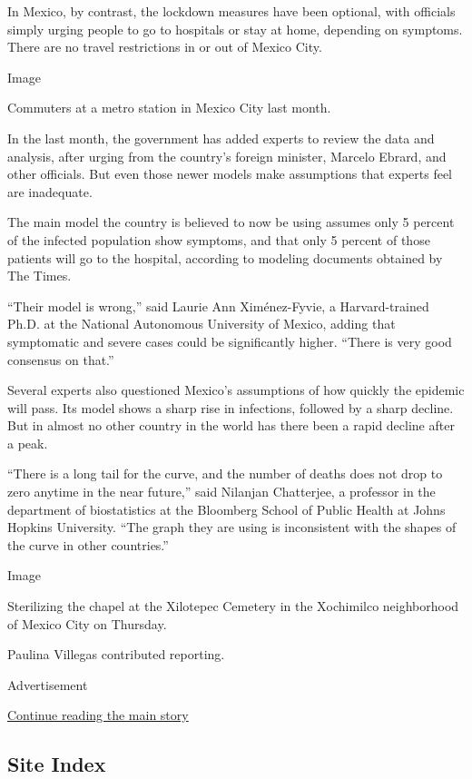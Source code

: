 In Mexico, by contrast, the lockdown measures have been optional, with
officials simply urging people to go to hospitals or stay at home,
depending on symptoms. There are no travel restrictions in or out of
Mexico City.

Image

Commuters at a metro station in Mexico City last month.

In the last month, the government has added experts to review the data
and analysis, after urging from the country's foreign minister, Marcelo
Ebrard, and other officials. But even those newer models make
assumptions that experts feel are inadequate.

The main model the country is believed to now be using assumes only 5
percent of the infected population show symptoms, and that only 5
percent of those patients will go to the hospital, according to modeling
documents obtained by The Times.

``Their model is wrong,'' said Laurie Ann Ximénez-Fyvie, a
Harvard-trained Ph.D. at the National Autonomous University of Mexico,
adding that symptomatic and severe cases could be significantly higher.
``There is very good consensus on that.''

Several experts also questioned Mexico's assumptions of how quickly the
epidemic will pass. Its model shows a sharp rise in infections, followed
by a sharp decline. But in almost no other country in the world has
there been a rapid decline after a peak.

``There is a long tail for the curve, and the number of deaths does not
drop to zero anytime in the near future,'' said Nilanjan Chatterjee, a
professor in the department of biostatistics at the Bloomberg School of
Public Health at Johns Hopkins University. ``The graph they are using is
inconsistent with the shapes of the curve in other countries.''

Image

Sterilizing the chapel at the Xilotepec Cemetery in the Xochimilco
neighborhood of Mexico City on Thursday.

Paulina Villegas contributed reporting.

Advertisement

\protect\hyperlink{after-bottom}{Continue reading the main story}

\hypertarget{site-index}{%
\subsection{Site Index}\label{site-index}}

